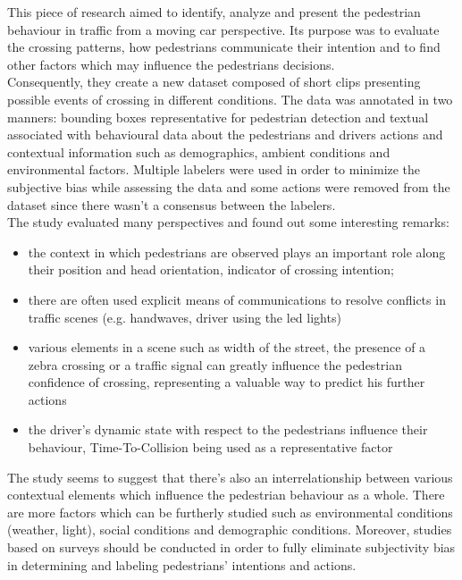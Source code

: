 \documentclass[runningheads,a4paper,11pt]{report}
\begin{document}
This piece of research aimed to identify, analyze and present the pedestrian behaviour in traffic from a moving car perspective. Its purpose was to evaluate the crossing patterns, how pedestrians communicate their intention and to find other factors which may influence the pedestrians decisions. \\
Consequently, they create a new dataset composed of short clips presenting possible events of crossing in different conditions. The data was annotated in two manners: bounding boxes representative for pedestrian detection and textual associated with behavioural data about the pedestrians and drivers actions and contextual information such as demographics, ambient conditions and environmental factors. Multiple labelers were used in order to minimize the subjective bias while assessing the data and some actions were removed from the dataset since there wasn't a consensus between the labelers. \\
The study evaluated many perspectives and found out some interesting remarks: \\
\begin{itemize}
	\item the context in which pedestrians are observed plays an important role along their position and head orientation, indicator of crossing intention;
	\item there are often used explicit means of communications to resolve conflicts in traffic scenes (e.g. handwaves, driver using the led lights)
	\item various elements in a scene such as width of the street, the presence of a zebra crossing or a traffic signal can greatly influence the pedestrian confidence of crossing, representing a valuable way to predict his further actions
	\item the driver's dynamic state with respect to the pedestrians influence their behaviour, Time-To-Collision being used as a representative factor
\end{itemize}
The study seems to suggest that there's also an interrelationship between various contextual elements which influence the pedestrian behaviour as a whole. There are more factors which can be furtherly studied such as environmental conditions (weather, light), social conditions and demographic conditions. Moreover, studies based on surveys should be conducted in order to fully eliminate subjectivity bias in determining and labeling pedestrians' intentions and actions. \\ 
\end{document}
